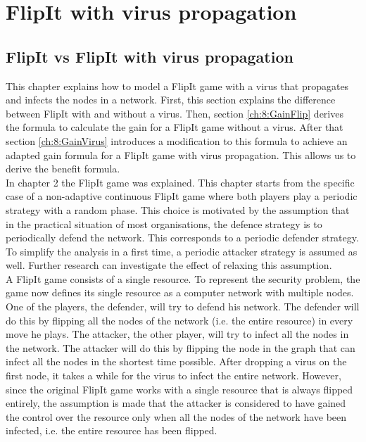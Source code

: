 \chapter{FlipIt with virus propagation }
\label{cha:6}


\section{FlipIt vs FlipIt with virus propagation}

This chapter explains how to model a FlipIt game with a virus that propagates and infects the nodes in a network. First, this section explains the difference between FlipIt with and without a virus. 
Then, section \ref{ch:8:GainFlip} derives the formula to calculate the gain for a FlipIt game without a virus. After that section \ref{ch:8:GainVirus} introduces a modification to this formula to achieve an adapted gain formula for a FlipIt game with virus propagation. This allows us to derive the benefit formula.\\


In chapter 2 the FlipIt game was explained.  This chapter starts from the specific case of a non-adaptive continuous FlipIt game where both players play a periodic strategy with a random phase. This choice is motivated by the assumption that in the practical situation of most organisations, the defence strategy is to periodically defend the network. This corresponds to a periodic defender strategy. To simplify the analysis in a first time, a periodic attacker strategy is assumed as well. Further research can investigate the effect of relaxing this assumption.\\


A FlipIt game consists of a single resource. To represent the security problem, the game now defines its single resource as a computer network with multiple
nodes. One of the players, the defender, will try to defend his network. The defender
will do this by flipping all the nodes of the network (i.e. the entire resource) in every move he plays. The
attacker, the other player, will try to infect all the nodes in the network. The attacker
will do this by flipping the node in the graph that can infect all the nodes in the
shortest time possible. After dropping a virus on the first node, it takes a while for the virus to infect the entire network. However, since the original FlipIt game works with a single resource that is always flipped entirely, the assumption is made that the attacker is considered to have gained the control over the resource only when all the nodes of the network have been infected, i.e. the entire resource has been flipped. 



